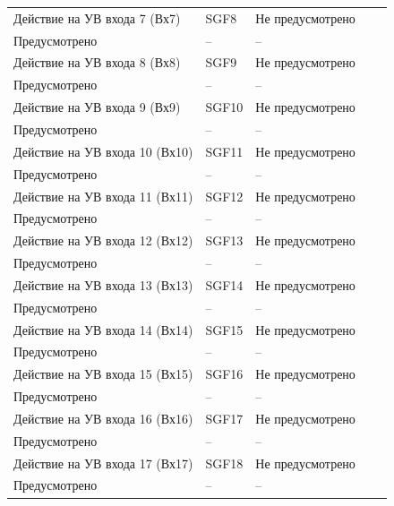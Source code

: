 \begin{longtable}{|>{\centering\arraybackslash}m{5.3cm}|>{\centering\arraybackslash}m{3.3cm}|>{\centering\arraybackslash}m{4.2cm}|>{\centering\arraybackslash}m{1.8cm}|>{\centering\arraybackslash}m{1cm}|}
\hline
\centering Действие на УВ входа 7 (Вх7)  & \centering SGF8 & \centering Не предусмотрено \\ Предусмотрено & \centering -- & \centering \arraybackslash -- \\
\hline
\centering Действие на УВ входа 8 (Вх8)  & \centering SGF9 & \centering Не предусмотрено \\ Предусмотрено & \centering -- & \centering \arraybackslash -- \\
\hline
\centering Действие на УВ входа 9 (Вх9)  & \centering SGF10 & \centering Не предусмотрено \\ Предусмотрено & \centering -- & \centering \arraybackslash -- \\
\hline
\centering Действие на УВ входа 10 (Вх10)  & \centering SGF11 & \centering Не предусмотрено \\ Предусмотрено & \centering -- & \centering \arraybackslash -- \\
\hline
\centering Действие на УВ входа 11 (Вх11)  & \centering SGF12 & \centering Не предусмотрено \\ Предусмотрено & \centering -- & \centering \arraybackslash -- \\
\hline
\centering Действие на УВ входа 12 (Вх12)  & \centering SGF13 & \centering Не предусмотрено \\ Предусмотрено & \centering -- & \centering \arraybackslash -- \\
\hline
\centering Действие на УВ входа 13 (Вх13)  & \centering SGF14 & \centering Не предусмотрено \\ Предусмотрено & \centering -- & \centering \arraybackslash -- \\
\hline
\centering Действие на УВ входа 14 (Вх14)  & \centering SGF15 & \centering Не предусмотрено \\ Предусмотрено & \centering -- & \centering \arraybackslash -- \\
\hline
\centering Действие на УВ входа 15 (Вх15)  & \centering SGF16 & \centering Не предусмотрено \\ Предусмотрено & \centering -- & \centering \arraybackslash -- \\
\hline
\centering Действие на УВ входа 16 (Вх16)  & \centering SGF17 & \centering Не предусмотрено \\ Предусмотрено & \centering -- & \centering \arraybackslash -- \\
\hline
\centering Действие на УВ входа 17 (Вх17)  & \centering SGF18 & \centering Не предусмотрено \\ Предусмотрено & \centering -- & \centering \arraybackslash -- \\

\end{longtable}
